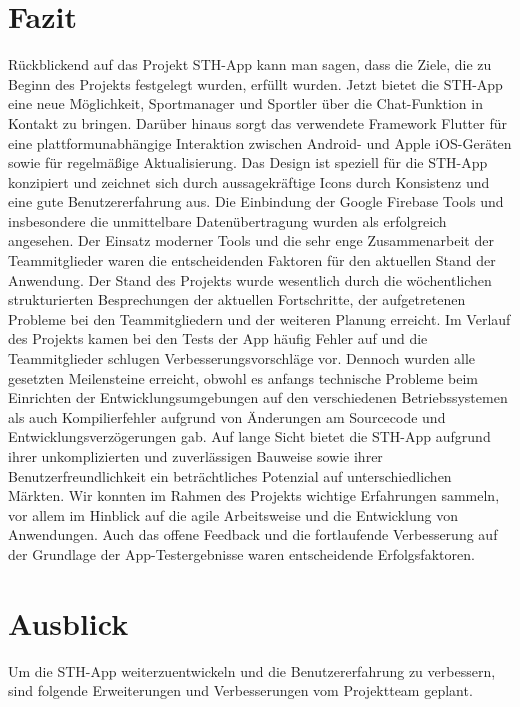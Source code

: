 \chapter{Fazit}
Rückblickend auf das Projekt STH-App kann man sagen, dass die Ziele, die zu Beginn des Projekts festgelegt wurden, erfüllt wurden.
Jetzt bietet die STH-App eine neue Möglichkeit, Sportmanager und Sportler über die Chat-Funktion in Kontakt zu bringen.
Darüber hinaus sorgt das verwendete Framework Flutter für eine plattformunabhängige Interaktion zwischen Android- und Apple iOS-Geräten sowie für regelmäßige Aktualisierung.
Das Design ist speziell für die STH-App konzipiert und zeichnet sich durch aussagekräftige Icons durch Konsistenz und eine gute Benutzererfahrung aus.
Die Einbindung der Google Firebase Tools und insbesondere die unmittelbare Datenübertragung wurden als erfolgreich angesehen.\newline
Der Einsatz moderner Tools und die sehr enge Zusammenarbeit der Teammitglieder waren die entscheidenden Faktoren für den aktuellen Stand der Anwendung.
Der Stand des Projekts wurde wesentlich durch die wöchentlichen strukturierten Besprechungen der aktuellen Fortschritte, der aufgetretenen Probleme bei den Teammitgliedern und der weiteren Planung erreicht.
Im Verlauf des Projekts kamen bei den Tests der App häufig Fehler auf und die Teammitglieder schlugen Verbesserungsvorschläge vor.
Dennoch wurden alle gesetzten Meilensteine erreicht, obwohl es anfangs technische Probleme beim Einrichten der Entwicklungsumgebungen auf den verschiedenen Betriebssystemen als auch Kompilierfehler aufgrund von Änderungen am Sourcecode und Entwicklungsverzögerungen gab.
Auf lange Sicht bietet die STH-App aufgrund ihrer unkomplizierten und zuverlässigen Bauweise sowie ihrer Benutzerfreundlichkeit ein beträchtliches Potenzial auf unterschiedlichen Märkten.\newline
Wir konnten im Rahmen des Projekts wichtige Erfahrungen sammeln, vor allem im Hinblick auf die agile Arbeitsweise und die Entwicklung von Anwendungen.
Auch das offene Feedback und die fortlaufende Verbesserung auf der Grundlage der App-Testergebnisse waren entscheidende Erfolgsfaktoren.
\chapter{Ausblick}

Um die STH-App weiterzuentwickeln und die Benutzererfahrung zu verbessern, sind folgende Erweiterungen und Verbesserungen vom Projektteam geplant.

